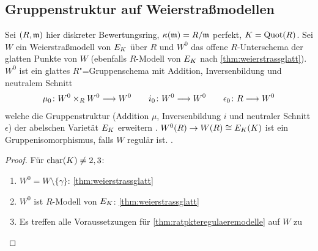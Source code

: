 \documentclass[german]{scrreprt}
\begin{document}
\subsection{Gruppenstruktur auf Weierstraßmodellen}

\begin{Lemma}\label{thm:erweiterunggruppenstruktur}
  Sei $(R,\mathfrak{m})$ hier diskreter Bewertungsring,
  $\kappa(\mathfrak{m})=R/\mathfrak{m}$ perfekt,
  $K=\operatorname{Quot}(R)$.
  Sei $W$ ein Weierstraßmodell von $E_{K}$ über $R$ und
  $W^0$ das offene $R$-Unterschema der glatten Punkte von $W$ 
  (ebenfalls $R$-Modell von $E_{K}$ nach \autoref{thm:weierstrassglatt}).
  $W^0$ ist ein glattes $R$"=Gruppenschema
  mit Addition, Inversenbildung und neutralem Schnitt
  \begin{gather*}
    \mu_0\colon W^0\times_R W^0 \longrightarrow W^0
    \qquad
    i_0\colon W^0\longrightarrow W^0
    \qquad
    \epsilon_0\colon R\longrightarrow W^0
  \end{gather*}
  welche die Gruppenstruktur (Addition $\mu$, Inversenbildung $i$ und
  neutraler Schnitt $\epsilon$)
  der abelschen Varietät $E_{K}$ erweitern
  \cite[Theorem IV.5.3 (c)]{silverman2}.
  $W^0(R)\to W(R) \cong E_{K}(K)$ ist ein Gruppenisomorphismus,
  falls $W$ regulär ist.
  \cite[Theorem IV.5.3 (b)]{silverman2}.
  \begin{proof} Für $\operatorname{char}(K)\neq 2,3$:
    \begin{enumerate}
    \item $W^0=W\setminus\{\gamma\}$: \autoref{thm:weierstrassglatt}
    \item $W^0$ ist $R$-Modell von $E_{K}$: \autoref{thm:weierstrassglatt}
    \item Es treffen alle Voraussetzungen für
      \autoref{thm:ratpkteregulaeremodelle} auf $W$ zu

\end{enumerate}
\end{proof}
\end{Lemma}
\end{document}
